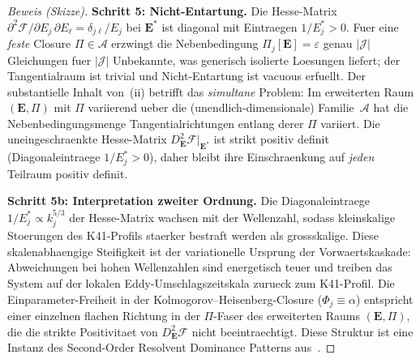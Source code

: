 \documentclass[12pt,a4paper]{article}
\theoremstyle{definition}
\theoremstyle{plain}
\theoremstyle{remark}
\begin{document}
\begin{proof}[Beweis (Skizze)]
\textbf{Schritt 5: Nicht-Entartung.}\;
Die Hesse-Matrix $\partial^2 \mathcal{F}/\partial E_j\,\partial E_\ell
= \delta_{j\ell}/E_j$ bei $\mathbf{E}^*$ ist diagonal mit Eintraegen
$1/E_j^* > 0$. Fuer eine \emph{feste} Closure $\Pi \in \mathscr{A}$
erzwingt die Nebenbedingung $\Pi_j[\mathbf{E}] = \varepsilon$ genau
$|\mathcal{J}|$ Gleichungen fuer $|\mathcal{J}|$ Unbekannte, was
generisch isolierte Loesungen liefert; der Tangentialraum ist trivial
und Nicht-Entartung ist vacuous erfuellt. Der substantielle Inhalt
von~(ii) betrifft das \emph{simultane} Problem: Im erweiterten Raum
$(\mathbf{E}, \Pi)$ mit $\Pi$ variierend ueber die
(unendlich-dimensionale) Familie~$\mathscr{A}$ hat die
Nebenbedingungsmenge Tangentialrichtungen entlang derer $\Pi$ variiert.
Die uneingeschraenkte Hesse-Matrix
$D^2_{\mathbf{E}}\mathcal{F}|_{\mathbf{E}^*}$ ist strikt positiv
definit (Diagonaleintraege $1/E_j^* > 0$), daher bleibt ihre
Einschraenkung auf \emph{jeden} Teilraum positiv definit.

\medskip
\noindent\textbf{Schritt 5b: Interpretation zweiter Ordnung.}\;
Die Diagonaleintraege $1/E_j^* \propto k_j^{5/3}$ der Hesse-Matrix wachsen
mit der Wellenzahl, sodass kleinskalige Stoerungen des K41-Profils staerker
bestraft werden als grossskalige. Diese skalenabhaengige Steifigkeit ist
der variationelle Ursprung der Vorwaertskaskade: Abweichungen bei hohen
Wellenzahlen sind energetisch teuer und treiben das System auf der lokalen
Eddy-Umschlagszeitskala zurueck zum K41-Profil. Die Einparameter-Freiheit
in der Kolmogorov--Heisenberg-Closure ($\Phi_j \equiv \alpha$) entspricht
einer einzelnen flachen Richtung in der $\Pi$-Faser des erweiterten Raums
$(\mathbf{E}, \Pi)$, die die strikte Positivitaet von
$D^2_{\mathbf{E}}\mathcal{F}$ nicht beeintraechtigt. Diese Struktur ist
eine Instanz des Second-Order Resolvent Dominance Patterns
aus~\cite{FST-Unified2026}.
\end{proof}
\end{document}
